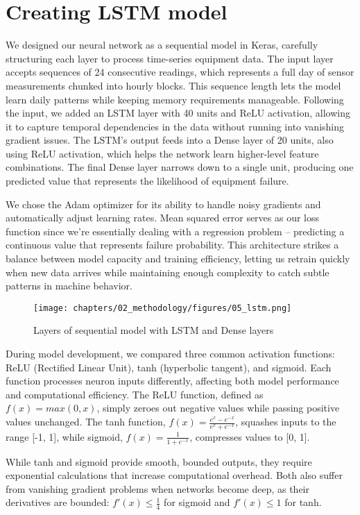 \section{Creating LSTM model}
We designed our neural network as a sequential model in Keras, carefully structuring each layer to process time-series equipment data. The input layer accepts sequences of 24 consecutive readings, which represents a full day of sensor measurements chunked into hourly blocks. This sequence length lets the model learn daily patterns while keeping memory requirements manageable. Following the input, we added an LSTM layer with 40 units and ReLU activation, allowing it to capture temporal dependencies in the data without running into vanishing gradient issues. The LSTM's output feeds into a Dense layer of 20 units, also using ReLU activation, which helps the network learn higher-level feature combinations. The final Dense layer narrows down to a single unit, producing one predicted value that represents the likelihood of equipment failure. 

We chose the Adam optimizer for its ability to handle noisy gradients and automatically adjust learning rates. Mean squared error serves as our loss function since we're essentially dealing with a regression problem – predicting a continuous value that represents failure probability. This architecture strikes a balance between model capacity and training efficiency, letting us retrain quickly when new data arrives while maintaining enough complexity to catch subtle patterns in machine behavior.

\begin{figure}[H]
    \centering
    \texttt{[image: chapters/02\_methodology/figures/05\_lstm.png]}
    \caption{Layers of sequential model with LSTM and Dense layers}
\end{figure}

During model development, we compared three common activation functions: ReLU (Rectified Linear Unit), tanh (hyperbolic tangent), and sigmoid. Each function processes neuron inputs differently, affecting both model performance and computational efficiency.
The ReLU function, defined as \(f(x) = max(0, x)\), simply zeroes out negative values while passing positive values unchanged. The tanh function, \(f(x) = \frac{e^x - e^{-x}}{e^x + e^{-x}}\), squashes inputs to the range [-1, 1], while sigmoid, \(f(x) = \frac{1}{1 + e^{-x}}\), compresses values to [0, 1]. 

While tanh and sigmoid provide smooth, bounded outputs, they require exponential calculations that increase computational overhead. Both also suffer from vanishing gradient problems when networks become deep, as their derivatives are bounded: \(f'(x) \leq \frac{1}{4}\) for sigmoid and \(f'(x) \leq 1\) for tanh.

